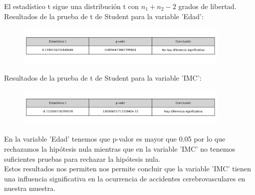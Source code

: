 \documentclass[a4paper, 12pt]{article}
\begin{document}
El estadístico t sigue una distribución t con \(n_1 + n_2 - 2\) grados de libertad.
\vspace{1cm}
\\   Resultados de la prueba de t de Student para la variable 'Edad':

\begin{figure}[H]
    \centering
    \includegraphics[width=0.9\textwidth]{img/Tablas/prueba_t_student_Edad.png}
\end{figure}

Resultados de la prueba de t de Student para la variable 'IMC':

\begin{figure}[H]
    \centering
    \includegraphics[width=0.9\textwidth]{img/Tablas/prueba_t_student_IMC.png}
\end{figure}

En la variable 'Edad' tenemos que p-valor es mayor que 0.05 por lo que rechazamos la hipótesis nula mientras que en la variable 'IMC' no tenemos suficientes pruebas para rechazar la hipótesis nula.
\\
Estos resultados nos permiten nos permite concluir que la variable 'IMC' tienen una influencia significativa en la ocurrencia de accidentes cerebrovasculares en nuestra muestra.
\end{document}
